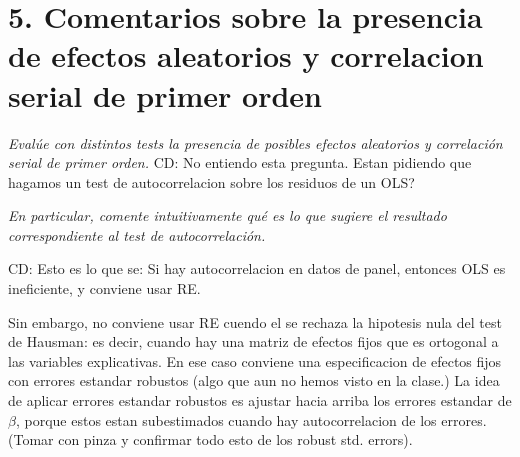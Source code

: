 \documentclass[
]{article}
\begin{document}
\hypertarget{comentarios-sobre-la-presencia-de-efectos-aleatorios-y-correlacion-serial-de-primer-orden}{%
\section{5. Comentarios sobre la presencia de efectos aleatorios y
correlacion serial de primer
orden}\label{comentarios-sobre-la-presencia-de-efectos-aleatorios-y-correlacion-serial-de-primer-orden}}

\emph{Evalúe con distintos tests la presencia de posibles efectos
aleatorios y correlación serial de primer orden.} CD: No entiendo esta
pregunta. Estan pidiendo que hagamos un test de autocorrelacion sobre
los residuos de un OLS?

\emph{En particular, comente intuitivamente qué es lo que sugiere el
resultado correspondiente al test de autocorrelación.}

CD: Esto es lo que se: Si hay autocorrelacion en datos de panel,
entonces OLS es ineficiente, y conviene usar RE.

Sin embargo, no conviene usar RE cuendo el se rechaza la hipotesis nula
del test de Hausman: es decir, cuando hay una matriz de efectos fijos
que es ortogonal a las variables explicativas. En ese caso conviene una
especificacion de efectos fijos con errores estandar robustos (algo que
aun no hemos visto en la clase.) La idea de aplicar errores estandar
robustos es ajustar hacia arriba los errores estandar de \(\beta\),
porque estos estan subestimados cuando hay autocorrelacion de los
errores. (Tomar con pinza y confirmar todo esto de los robust std.
errors).
\end{document}
